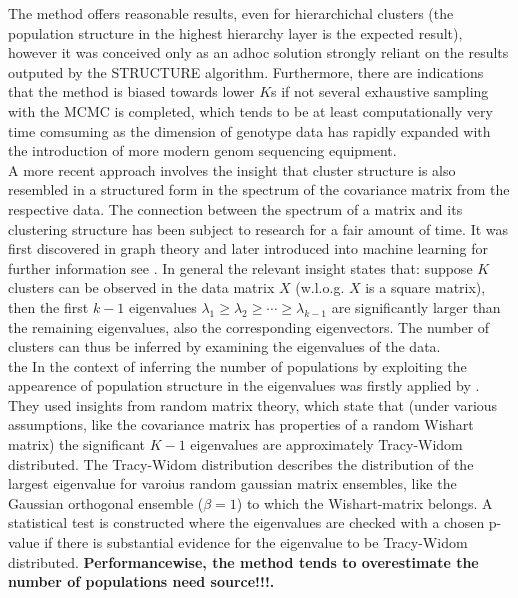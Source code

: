\documentclass[a4paper, 11pt]{article}
\begin{document}
The method offers reasonable results, even for hierarchichal clusters (the population structure in the highest hierarchy layer is the expected result), however it was conceived only as an adhoc solution strongly reliant on the results outputed by the STRUCTURE algorithm. Furthermore, there are indications that the method is biased towards lower $K$s if not several exhaustive sampling with the MCMC is completed, which tends to be at least computationally very time comsuming as the dimension of genotype data has rapidly expanded with the introduction of more modern genom sequencing equipment.\\

A more recent approach involves the insight that cluster structure is also resembled in a structured form in the spectrum of the covariance matrix from the respective data. The connection between the spectrum of a matrix and its clustering structure has been subject to research for a fair amount of time. It was first discovered in graph theory \cite{donath1973lower} \cite{fiedler1973algebraic} and later introduced into machine learning \parencite{shi2000normalized, meila2001random, ng2002spectral} for further information see \cite{von2007tutorial}. In general the relevant insight states that: suppose $K$ clusters can be observed in the data matrix $X$ (w.l.o.g. $X$ is a square matrix), then the first $k-1$ eigenvalues $\lambda_1 \geq \lambda_2 \geq \cdots \geq \lambda_{k-1}$ are significantly larger than the remaining eigenvalues, also the corresponding eigenvectors. The number of clusters can thus be inferred by examining the eigenvalues of the data.\\ the In the context of inferring the number of populations by exploiting the appearence of population structure in the eigenvalues was firstly applied by \cite{patterson2006population}. They used insights from random matrix theory, which state that (under various assumptions, like the covariance matrix has properties of a random Wishart matrix) the significant $K-1$ eigenvalues are approximately Tracy-Widom distributed. The Tracy-Widom distribution describes the distribution of the largest eigenvalue for varoius random gaussian matrix ensembles, like the Gaussian orthogonal ensemble ($\beta = 1$) to which the Wishart-matrix belongs. A statistical test is constructed where the eigenvalues are checked with a chosen p-value if there is substantial evidence for the eigenvalue to be Tracy-Widom distributed. \textbf{Performancewise, the method tends to overestimate the number of populations need source!!!.}\\
\end{document}
